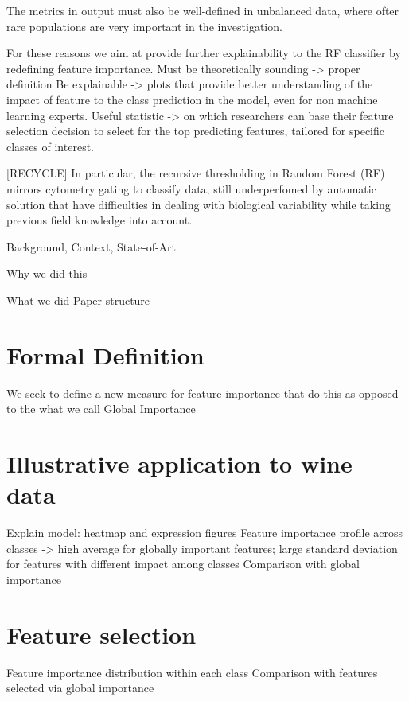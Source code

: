 \documentclass[12pt,a4paper]{article}
\theoremstyle{definition}
\theoremstyle{plain}
\theoremstyle{remark}
\begin{document}
The metrics in output must also be well-defined in unbalanced data, where ofter rare populations are very important in the investigation.

For these reasons we aim at provide further explainability to the RF classifier by redefining feature importance.
Must be theoretically sounding -> proper definition
Be explainable -> plots that provide better understanding of the impact of feature to the class prediction in the model, even for non machine learning experts.
Useful statistic -> on which researchers can base their feature selection decision to select for the top predicting features, tailored for specific classes of interest.


[RECYCLE] In particular, the recursive thresholding in Random Forest (RF) mirrors cytometry gating to classify data, still underperfomed by automatic solution that have difficulties in dealing with biological variability while taking previous field knowledge into account.

Background, Context, State-of-Art

Why we did this

What we did-Paper structure


\section{Formal Definition}\label{sec:conv_stat}
We seek to define a new measure for feature importance
that do this
as opposed to the what we call Global Importance

\section{Illustrative application to wine data}\label{sec:matrix_rank}

Explain model: heatmap and expression figures
Feature importance profile across classes -> high average for globally important features; large standard deviation for features with different impact among classes
Comparison with global importance

\section{Feature selection}\label{sec:pow_comp}
Feature importance distribution within each class
Comparison with features selected via global importance
\end{document}

